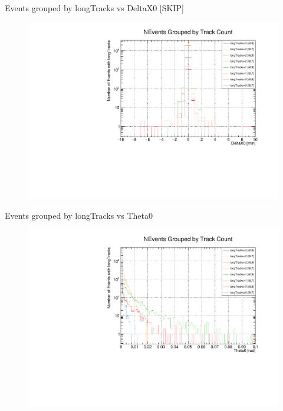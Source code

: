 \begin{frame}{Events grouped by longTracks vs DeltaX0 [SKIP]}
    \begin{figure}
        \includegraphics[width=\linewidth]{./output/Effi_DeltaX0_all.pdf}
    \end{figure}
\end{frame}

\begin{frame}{Events grouped by longTracks vs Theta0 }
    \begin{figure}
        \includegraphics[width=\linewidth]{./output/Effi_Theta0_all.pdf}
    \end{figure}
\end{frame}


